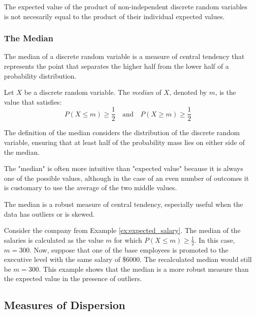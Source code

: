 The expected value of the product of non-independent discrete random variables is not necesarily equal to the product of their individual expected values.


\subsubsection*{The Median}

The median of a discrete random variable is a measure of central tendency that represents the point that separates the higher half from the lower half of a probability distribution.

\begin{definition}
Let $X$ be a discrete random variable. The \emph{median} of $X$, denoted by $m$, is the value that satisfies:
\[
P\left(X\leq m\right)\geq \frac{1}{2} \quad \text{and} \quad P\left(X\geq m\right)\geq \frac{1}{2}
\]
\end{definition}

The definition of the median considers the distribution of the discrete random variable, ensuring that at least half of the probability mass lies on either side of the median.

The "median" is often more intuitive than "expected value" because it is always one of the possible values, although in the case of an even number of outcomes it is customary to use the average of the two middle values.

The median is a robust measure of central tendency, especially useful when the data has outliers or is skewed.

\begin{example}
Consider the company from Example \ref{ex:expected_salary}. The median of the salaries is calculated as the value $m$ for which $P\left(X\leq m\right)\geq \frac{1}{2}$. In this case, $m=300$. Now, suppose that one of the base employees is promoted to the executive level with the same salary of \$6000. The recalculated median would still be $m=300$. This example shows that the median is a more robust measure than the expected value in the presence of outliers.
\end{example}

%
%

\subsection{Measures of Dispersion}

